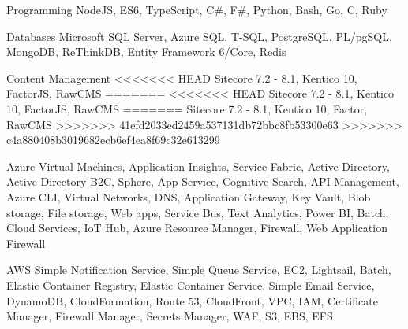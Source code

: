 \begin{cvskills}
  \cvskill
    {Programming} %
    {NodeJS, ES6, TypeScript, C\#, F\#, Python, Bash, Go, C, Ruby} %

  \cvskill
    {Databases} %
    {Microsoft SQL Server, Azure SQL, T-SQL, PostgreSQL, PL/pgSQL, MongoDB, ReThinkDB, Entity Framework 6/Core, Redis} %

  \cvskill
    {Content Management} %
<<<<<<< HEAD
    {Sitecore 7.2 - 8.1, Kentico 10, FactorJS, RawCMS} %
=======
<<<<<<< HEAD
    {Sitecore 7.2 - 8.1, Kentico 10, FactorJS, RawCMS} %
=======
    {Sitecore 7.2 - 8.1, Kentico 10, Factor, RawCMS} %
>>>>>>> 41efd2033ed2459a537131db72bbc8fb53300e63
>>>>>>> c4a880408b3019682ecb6ef4ea8f69c32e613299

  \cvskill
    {Azure} %
    {Virtual Machines, Application Insights, Service Fabric, Active Directory, Active Directory B2C, Sphere, App Service, Cognitive Search, API Management, Azure CLI, Virtual Networks, DNS, Application Gateway, Key Vault, Blob storage, File storage, Web apps, Service Bus, Text Analytics, Power BI, Batch, Cloud Services, IoT Hub, Azure Resource Manager, Firewall, Web Application Firewall} %

  \cvskill
    {AWS} %
    {Simple Notification Service, Simple Queue Service, EC2, Lightsail, Batch, Elastic Container Registry, Elastic Container Service, Simple Email Service, DynamoDB, CloudFormation, Route 53, CloudFront, VPC, IAM, Certificate Manager, Firewall Manager, Secrets Manager, WAF, S3, EBS, EFS} %

\end{cvskills}
